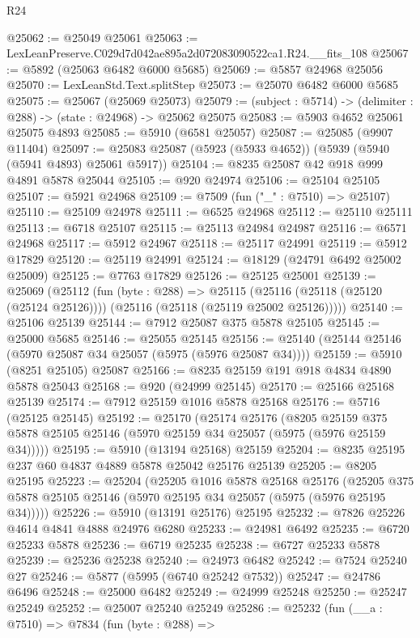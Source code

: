 \begin{lexlean}{R24}
\begin{coremodule}
@25062 := @25049 @25061
@25063 := LexLeanPreserve.C029d7d042ae895a2d072083090522ca1.R24.__fits_108
@25067 := @5892 (@25063 @6482 @6000 @5685)
@25069 := @5857 @24968 @25056
@25070 := LexLeanStd.Text.splitStep
@25073 := @25070 @6482 @6000 @5685
@25075 := @25067 (@25069 @25073)
@25079 := (subject : @5714) -> (delimiter : @288) -> (state : @24968) -> @25062 @25075
@25083 := @5903 @4652 @25061 @25075 @4893
@25085 := @5910 (@6581 @25057)
@25087 := @25085 (@9907 @11404)
@25097 := @25083 @25087 (@5923 (@5933 @4652)) (@5939 (@5940 (@5941 @4893) @25061 @5917))
@25104 := @8235 @25087 @42 @918 @999 @4891 @5878 @25044
@25105 := @920 @24974
@25106 := @25104 @25105
@25107 := @5921 @24968
@25109 := @7509 (fun ("_" : @7510) => @25107)
@25110 := @25109 @24978
@25111 := @6525 @24968
@25112 := @25110 @25111
@25113 := @6718 @25107
@25115 := @25113 @24984 @24987
@25116 := @6571 @24968
@25117 := @5912 @24967
@25118 := @25117 @24991
@25119 := @5912 @17829
@25120 := @25119 @24991
@25124 := @18129 (@24791 @6492 @25002 @25009)
@25125 := @7763 @17829
@25126 := @25125 @25001
@25139 := @25069
    (@25112
      (fun (byte : @288) =>
      @25115 (@25116 (@25118 (@25120 (@25124 @25126)))) (@25116 (@25118 (@25119 @25002 @25126)))))
@25140 := @25106 @25139
@25144 := @7912 @25087 @375 @5878 @25105
@25145 := @25000 @5685
@25146 := @25055 @25145
@25156 := @25140 (@25144 @25146 (@5970 @25087 @34 @25057 (@5975 (@5976 @25087 @34))))
@25159 := @5910 (@8251 @25105) @25087
@25166 := @8235 @25159 @191 @918 @4834 @4890 @5878 @25043
@25168 := @920 (@24999 @25145)
@25170 := @25166 @25168 @25139
@25174 := @7912 @25159 @1016 @5878 @25168
@25176 := @5716 (@25125 @25145)
@25192 := @25170
    (@25174
      @25176
      (@8205 @25159 @375 @5878 @25105 @25146 (@5970 @25159 @34 @25057 (@5975 (@5976 @25159 @34)))))
@25195 := @5910 (@13194 @25168) @25159
@25204 := @8235 @25195 @237 @60 @4837 @4889 @5878 @25042 @25176 @25139
@25205 := @8205 @25195
@25223 := @25204
    (@25205
      @1016
      @5878
      @25168
      @25176
      (@25205 @375 @5878 @25105 @25146 (@5970 @25195 @34 @25057 (@5975 (@5976 @25195 @34)))))
@25226 := @5910 (@13191 @25176) @25195
@25232 := @7826 @25226 @4614 @4841 @4888 @24976 @6280
@25233 := @24981 @6492
@25235 := @6720 @25233 @5878
@25236 := @6719 @25235
@25238 := @6727 @25233 @5878
@25239 := @25236 @25238
@25240 := @24973 @6482
@25242 := @7524 @25240 @27
@25246 := @5877 (@5995 (@6740 @25242 @7532))
@25247 := @24786 @6496
@25248 := @25000 @6482
@25249 := @24999 @25248
@25250 := @25247 @25249
@25252 := @25007 @25240 @25249
@25286 := @25232
    (fun (__a : @7510) =>
    @7834
      (fun (byte : @288) =>

\end{coremodule}
\end{lexlean}
